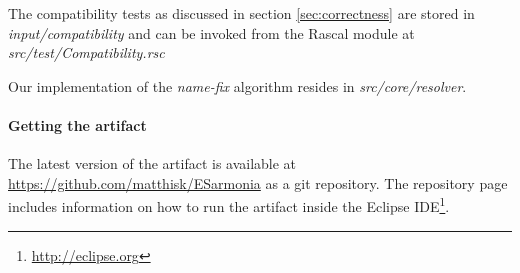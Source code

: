 The compatibility tests as discussed in section \ref{sec:correctness} are stored in \textit{input/compatibility} and can be invoked from the Rascal module at \textit{src/test/Compatibility.rsc}

Our implementation of the \textit{name-fix}\citep{Erdweg2014a} algorithm resides in \textit{src/core/resolver}.

\paragraph{Getting the artifact}
The latest version of the artifact is available at \url{https://github.com/matthisk/ESarmonia} as a git repository. The repository page includes information on how to run the artifact inside the Eclipse IDE\footnote{\url{http://eclipse.org}}.
